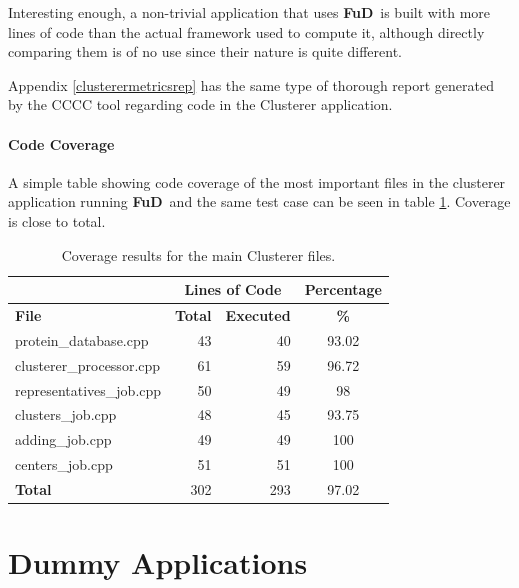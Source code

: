 \documentclass[a4paper,12pt,english]{report}
\newcommand{\fud}{\textbf{FuD}}
\begin{document}
Interesting enough, a non-trivial application that uses \fud \ is built with more lines of code than the actual framework used to compute it, although directly comparing them is of no use since their nature is quite different.

Appendix \ref{clusterermetricsrep} has the same type of thorough report generated by the CCCC tool regarding code in the Clusterer application.

\subsubsection{Code Coverage}

A simple table showing code coverage of the most important files in the clusterer application running \fud \ and the same test case can be seen in table \ref{cluscov}. Coverage is close to total.

\begin{table}[!htf]
\begin{center}
\begin{tabular}{|l|r|r|c|}
\hline
 & \multicolumn{2}{|c|}{Lines of Code} & Percentage \\
\hline
\textbf{File} & \textbf{Total} & \textbf{Executed} & \textbf{\%} \\
\hline
\scriptsize{protein\_database.cpp} & 43 & 40 & 93.02 \\
\hline 
\scriptsize{clusterer\_processor.cpp} & 61 & 59 & 96.72 \\
\hline 
\scriptsize{representatives\_job.cpp} & 50 & 49 & 98 \\
\hline 
\scriptsize{clusters\_job.cpp} & 48 & 45 & 93.75 \\
\hline 
\scriptsize{adding\_job.cpp} & 49 & 49 & 100 \\
\hline 
\scriptsize{centers\_job.cpp} & 51 & 51 & 100 \\
\hline 
\textbf{Total} & 302 & 293 & 97.02 \\
\hline
\end{tabular}
\caption{Coverage results for the main Clusterer files.} \label{cluscov}
\end{center}
\end{table}


\chapter{Dummy Applications}
\end{document}
